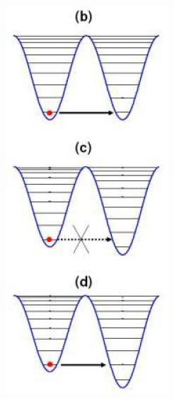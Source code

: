 \begin{figure}
\begin{subfigure}{0.21\linewidth}
        \includegraphics[width=\linewidth]{img/mn12_tunneling.png}

\end{subfigure}
\end{figure}
